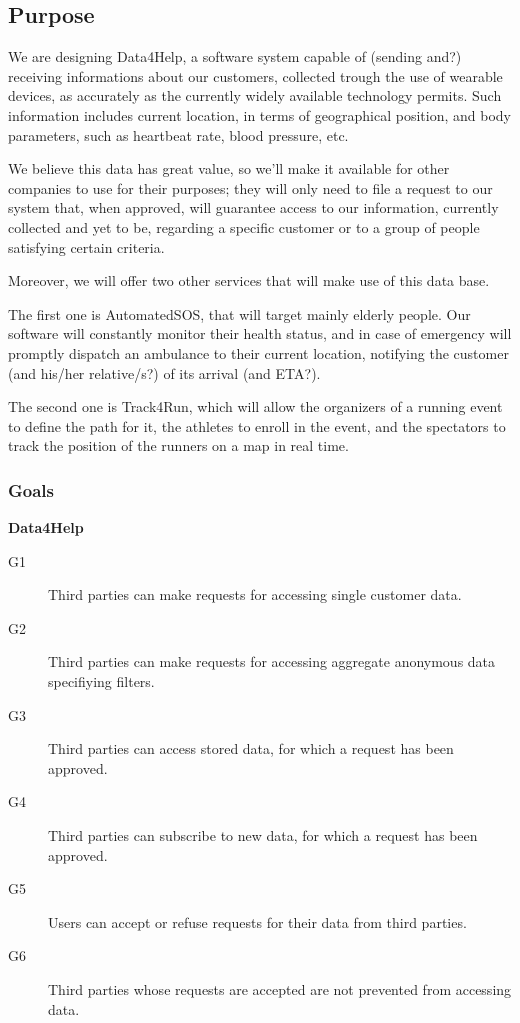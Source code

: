 \documentclass[../main.tex]{subfiles}
\begin{document}
\subsection{Purpose}

We are designing Data4Help, a software system capable of (sending and?) receiving informations about our customers, collected trough the use of wearable devices, as accurately as the currently widely available technology permits.
Such information includes current location, in terms of geographical position, and body parameters, such as heartbeat rate, blood pressure, etc.

We believe this data has great value, so we'll make it available for other companies to use for their purposes; they will only need to file a request to our system that, when approved, will guarantee access to our information, currently collected and yet to be, regarding a specific customer or to a group of people satisfying certain criteria.

Moreover, we will offer two other services that will make use of this data base.

The first one is AutomatedSOS, that will target mainly elderly people. Our software will constantly monitor their health status, and in case of emergency will promptly dispatch an ambulance to their current location, notifying the customer (and his/her relative/s?) of its arrival (and ETA?).

The second one is Track4Run, which will allow the organizers of a running event to define the path for it, the athletes to enroll in the event, and the spectators to track the position of the runners on a map in real time.


\subsubsection{Goals}

\begin{minipage}{\textwidth}
{\bf Data4Help}
\begin{description}
	\item [G1]  Third parties can make requests for accessing single customer data.
	\item [G2]  Third parties can make requests for accessing aggregate anonymous data specifiying filters.
	\item [G3]  Third parties can access stored data, for which a request has been approved.
	\item [G4]  Third parties can subscribe to new data, for which a request has been approved.
	\item [G5]  Users can accept or refuse requests for their data from third parties.
	\item [G6]  Third parties whose requests are accepted are not prevented from accessing data.
\end{description}
\end{minipage}
\vspace{8mm}
\end{document}
